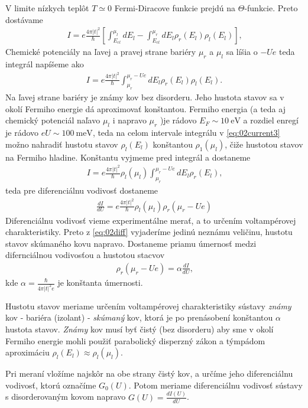 V limite nízkych teplôt $T \simeq 0$ Fermi-Diracove funkcie prejdú na $\Theta$-funkcie. Preto dostávame
\begin{align}
I=e\frac{4\pi|t|^2}{\hbar}[\int_{E_{cl}}^{\mu_l}dE_l-\int_{E_{cl}}^{\mu_r}dE_l\rho_r(E_l)\rho_l(E_l)]\text{,}
\end{align}
Chemické potenciály na ľavej a pravej strane bariéry $\mu_r$ a $\mu_l$ sa líšia o $-Ue$ teda integrál napíšeme ako
\begin{align}
\label{eq:02current3}
I = e \frac{4\pi|t|^2}{\hbar}\int_{\mu_r}^{\mu_r-Ue}dE_l\rho_r(E_l)\rho_l(E_l)\text{.}
\end{align}
 Na ľavej strane bariéry je známy kov bez disorderu. Jeho hustota stavov sa v okolí Fermiho energie dá aproximovať konštantou. Fermiho energia (a teda aj chemický potenciál naľavo $\mu_l$ i napravo $\mu_r$ )je rádovo $E_F\sim\SI{10}{\eV}$ a rozdiel enregí je rádovo $eU\sim \SI{100}{\milli\eV}$, teda na celom intervale integrálu v
\eqref{eq:02current3} možno nahradiť hustotu stavov $\rho_l(E_l)$ konštantou $\rho_1(\mu_l)$, čiže hustotou stavov na Fermiho hladine. Konštantu vyjmeme pred integrál a dostaneme
\begin{align}
I = e \frac{4\pi|t|^2}{\hbar}\rho_l(\mu_l)\int_{\mu_r}^{\mu_r-Ue}dE_l\rho_r(E_l)\text{,}
\end{align}
teda pre diferenciálnu vodivosť dostaneme
\begin{align}
\label{eq:02diff}
\frac{d I}{d U}=e\frac{4\pi|t|^2}{\hbar}\rho_l(\mu_l)\rho_r(\mu_r-Ue)
\end{align}
Diferenciálnu vodivosť vieme experimentálne merať, a to určením voltampérovej charakteristiky. Preto z \eqref{eq:02diff} vyjaderíme jedinú neznámu veličinu, hustotu stavov skúmaného kovu napravo. Dostaneme priamu úmernosť medzi difernciálnou vodivosťou a hustotou stacvov 
\begin{align}
\rho_r(\mu_r-Ue)=\alpha \frac{d I}{d U} \text{,}
\end{align}
kde $\alpha=\frac{\hbar}{4\pi|t|^2e}$ je konštanta úmernosti. 

Hustotu stavov meriame určením voltampérovej charakteristiky sústavy {\it známy} kov - bariéra (izolant) - {\it skúmaný} kov, ktorá je po prenásobení konštantou $\alpha$ hustota stavov. {\it Známy} kov musí byť čistý (bez disorderu) aby sme v okolí Fermiho energie mohli použiť parabolický disperzný zákon a týmpádom aproximáciu $\rho_l(E_l)\approx\rho_l(\mu_l)$. 

Pri meraní vložíme najskôr na obe strany čistý kov, a určíme jeho diferenciálnu vodivosť, ktorú označíme  $G_0(U)$. Potom meriame diferenciálnu vodivosť sústavy s disorderovaným kovom napravo $G(U)=\frac{dI(U)}{dU}$. 

